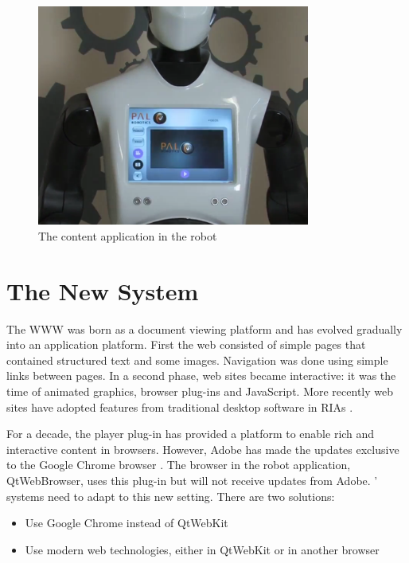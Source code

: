 \begin{figure}[htb]
    \centering
    \includegraphics[width=0.8\textwidth]{figures/demo-app-robot}
    \caption{The content application in the robot}
    \label{fig:demo-app-robot}
\end{figure}



\section{The New System}
The \ac{WWW} was born as a document viewing platform and has evolved gradually into an application platform. 
First the web consisted of simple pages that contained structured text and some images. 
Navigation was done using simple links between pages. 
In a second phase, web sites became interactive: 
it was the time of animated graphics, browser plug-ins and JavaScript. 
More recently web sites have adopted features from traditional desktop software in \acp{RIA} \cite{Anttonen:2011}.

For a decade, the \flash player plug-in has provided a platform to enable rich and interactive content in browsers.
However, Adobe has made the updates exclusive to the Google Chrome browser \cite{FlashRoadmap}. 
The browser in the robot application, QtWebBrowser, uses this plug-in but will not receive updates from Adobe. \company ' systems need to adapt to this new setting. 
There are two solutions:
\begin{itemize}
	\item Use Google Chrome instead of QtWebKit
	\item Use modern web technologies, either in QtWebKit or in another browser
\end{itemize}

